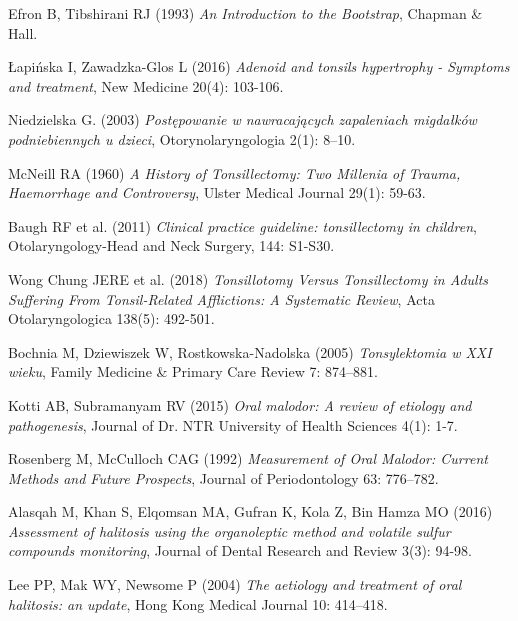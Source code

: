 \documentclass[12pt,a4paper,notitlepage]{report}
\begin{document}
\begin{thebibliography}{26}


 Efron B, Tibshirani RJ (1993) \emph{An Introduction to the Bootstrap}, Chapman \&  Hall. 

 Łapińska I, Zawadzka-Glos L (2016) \emph{Adenoid and tonsils hypertrophy - Symptoms and treatment}, New Medicine 20(4): 103-106.

 Niedzielska G. (2003) \emph{Postępowanie w nawracających zapaleniach migdałków podniebiennych u dzieci}, Otorynolaryngologia 2(1): 8–10.

 McNeill RA (1960) \emph{A History of Tonsillectomy: Two Millenia of Trauma, Haemorrhage and Controversy}, Ulster Medical Journal 29(1): 59-63. 

 Baugh RF et al. (2011) \emph {Clinical practice guideline: tonsillectomy in children},  Otolaryngology-Head and Neck Surgery, 144: S1-S30.

 Wong Chung JERE et al. (2018) \emph{Tonsillotomy Versus Tonsillectomy in Adults Suffering From Tonsil-Related Afflictions: A Systematic Review}, Acta Otolaryngologica 138(5): 492-501.


 Bochnia M, Dziewiszek W, Rostkowska-Nadolska (2005) \emph{Tonsylektomia w XXI wieku}, Family Medicine \& Primary Care Review 7:  874–881.

 Kotti AB, Subramanyam RV (2015) \emph{Oral malodor: A review of etiology and pathogenesis}, Journal of Dr. NTR University of Health Sciences 4(1): 1-7.

 Rosenberg M, McCulloch CAG (1992) \emph{Measurement of Oral Malodor: Current Methods and Future Prospects}, Journal of Periodontology 63: 776–782.

 Alasqah M, Khan S, Elqomsan MA, Gufran K, Kola Z, Bin Hamza MO (2016) \emph{Assessment of halitosis using the organoleptic method and volatile sulfur compounds monitoring}, Journal of Dental Research and Review 3(3): 94-98.

 Lee PP, Mak WY, Newsome P (2004) \emph{The aetiology and treatment of oral halitosis: an update}, Hong Kong Medical Journal  10: 414–418.


\end{thebibliography}
\end{document}
